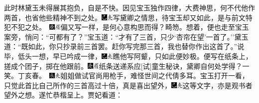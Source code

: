 此时林黛玉未得展其抱负，自是不快。因见宝玉独作四律，大费神思，何不代他作两首，也省他些精神不到之处。{\includegraphics[width=3mm]{../Images/00003}\includegraphics[width=3mm]{../Images/00012}\footnotesize \kaishu 写黛卿之情思，待宝玉却又如此，是与前文特犯不犯之处。　{\includegraphics[width=3mm]{../Images/00004}\includegraphics[width=3mm]{../Images/00010}\footnotesize \kaishu 偏又写一样，是何心意构思而得？畸笏。}}想着，便也走至宝玉案旁，悄问：``可都有了？''宝玉道：``才有了三首，只少`杏帘在望'一首了。''黛玉道：``既如此，你只抄录前三首罢。赶你写完那三首，我也替你作出这首了。''说毕，低头一想，早已吟成一律，{\includegraphics[width=3mm]{../Images/00003}\includegraphics[width=3mm]{../Images/00012}\footnotesize \kaishu 瞧他写阿颦，只如此便妙极。}便写在纸条上，搓成个团子，掷在他跟前。{{\includegraphics[width=3mm]{../Images/00004}\includegraphics[width=3mm]{../Images/00010}\footnotesize \kaishu 纸条送递系应{[}试{]}童生秘诀，黛卿自何处学得？一笑。丁亥春。　}\includegraphics[width=3mm]{../Images/00009}\includegraphics[width=3mm]{../Images/00012}\footnotesize \kaishu 姐姐做试官尚用枪手，难怪世间之代倩多耳。}宝玉打开一看，只觉此首比自己所作的三首高过十倍，真是喜出望外，{\includegraphics[width=3mm]{../Images/00003}\includegraphics[width=3mm]{../Images/00012}\footnotesize \kaishu 这等文字，亦是观书者望外之想。}遂忙恭楷呈上。贾妃看道：

